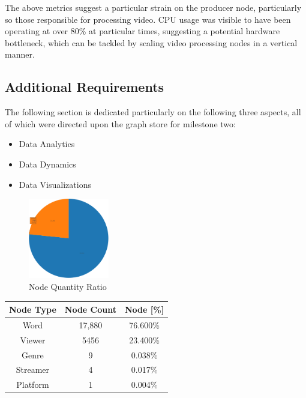 \documentclass[10pt,conference]{IEEEtran}
\begin{document}
The above metrics suggest a particular strain on the producer node, particularly so those responsible for processing video. CPU usage was visible to have been operating at over 80\% at particular times, suggesting a potential hardware bottleneck, which can be tackled by scaling video processing nodes in a vertical manner.

\subsection{Additional Requirements}
The following section is dedicated particularly on the following three aspects, all of which were directed upon the graph store for milestone two:
\begin{itemize}
    \item Data Analytics
    \item Data Dynamics
    \item Data Visualizations
\end{itemize}

\begin{figure}[h]
    \centering
    \includegraphics[height=3.5cm,keepaspectratio]{NodeQuantityRatio.png}
    \captionsetup                                 {justification=centering}
    \caption                                      {Node Quantity Ratio}
    \label                                        {fig:NodeQuantityRatio}
\end{figure}

\begin{table}[h]
    \centering
    \begin{tabular}{|c|c|c|}
        \hline
        \textbf{Node Type}&\textbf{Node Count}&\textbf{Node [\%]}   \\ \hline
        Word&17,880&76.600\%                                        \\ \hline
        Viewer&5456&23.400\%                                        \\ \hline
        Genre&9&0.038\%                                             \\ \hline
        Streamer&4&0.017\%                                          \\ \hline
        Platform&1&0.004\%                                          \\ \hline


    \end{tabular}
    \label{tab:Milestone2NodeCounts}
\end{table}
\end{document}
